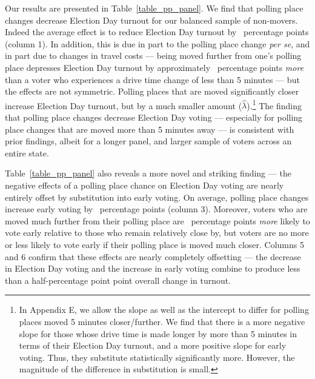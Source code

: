 \documentclass{cup_PSRM}
\begin{document}
Our results are presented in Table~\ref{table_pp_panel}.  We find that polling place changes decrease Election Day turnout for our balanced sample of non-movers. Indeed the average effect is to reduce Election Day turnout by \unskip~percentage points (column 1).  In addition, this is due in part to the polling place change \emph{per se}, and in part due to changes in travel costs --- being moved further from one's polling place depresses Election Day turnout by approximately \unskip~percentage points \emph{more} than a voter who experiences a drive time change of less than 5 minutes --- but the effects are not symmetric.  Polling places that are moved significantly closer increase Election Day turnout, but by a much smaller amount ($\hat{\lambda}$).\footnote{In Appendix E, we allow the slope as well as the intercept to differ for polling places moved 5 minutes closer/further.  We find that there is a more negative slope for those whose drive time is made longer by more than 5 minutes in terms of their Election Day turnout, and a more positive slope for early voting.  Thus, they substitute statistically significantly more.  However, the magnitude of the difference in substitution is small.}  The finding that polling place changes decrease Election Day voting --- especially for polling place changes that are moved more than 5 minutes away --- is consistent with prior findings, albeit for a longer panel, and larger sample of voters across an entire state.

Table~\ref{table_pp_panel} also reveals a more novel and striking finding --- the negative effects of a polling place chance on Election Day voting are nearly entirely offset by substitution into early voting. On average, polling place changes increase early voting by \unskip~percentage points (column 3). Moreover, voters who are moved much further from their polling place are \unskip~percentage points \emph{more} likely to vote early relative to those who remain relatively close by, but voters are no more or less likely to vote early if their polling place is moved much closer.  Columns 5 and 6 confirm that these effects are nearly completely offsetting --- the decrease in Election Day voting and the increase in early voting combine to produce less than a half-percentage point point overall change in turnout.
\end{document}

